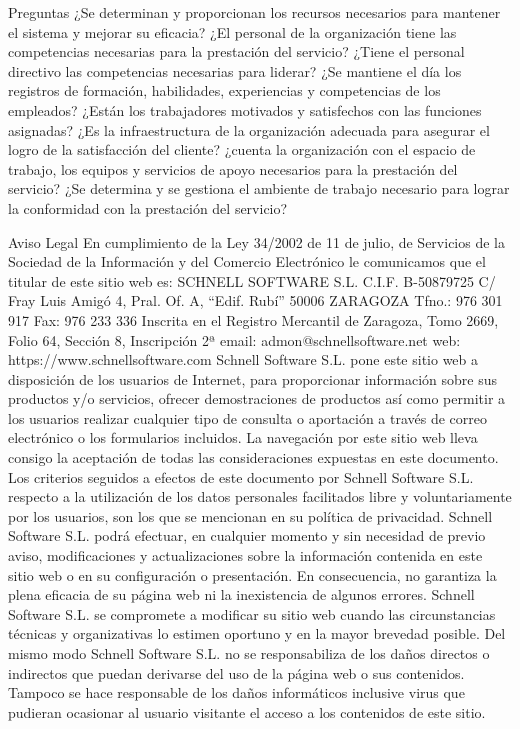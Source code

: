 \documentclass[10pt,a4paper]{article}
\begin{document}
\begin{enumerate}
Preguntas
¿Se determinan y proporcionan los recursos necesarios para mantener el sistema y mejorar su eficacia?
¿El personal de la organización tiene las competencias necesarias para la prestación del servicio?
¿Tiene el personal directivo las competencias necesarias para liderar?
¿Se mantiene el día los registros de formación, habilidades, experiencias y competencias de los empleados?
¿Están los trabajadores motivados y satisfechos con las funciones asignadas?
¿Es la infraestructura de la organización adecuada para asegurar el logro de la satisfacción del cliente?
¿cuenta la organización con el espacio de trabajo, los equipos y servicios de apoyo necesarios para la prestación del servicio?
¿Se determina y se gestiona el ambiente de trabajo necesario para lograr la conformidad con la prestación del servicio?

Aviso Legal
En cumplimiento de la Ley 34/2002 de 11 de julio, de Servicios de la Sociedad de la Información y del Comercio Electrónico le comunicamos que el titular de este sitio web es:
SCHNELL SOFTWARE S.L.
C.I.F. B-50879725
C/ Fray Luis Amigó 4, Pral. Of. A, “Edif. Rubí”
50006 ZARAGOZA
Tfno.: 976 301 917 Fax: 976 233 336
Inscrita en el Registro Mercantil de Zaragoza, Tomo 2669, Folio 64, Sección 8, Inscripción 2ª
email: admon@schnellsoftware.net
web: https://www.schnellsoftware.com
Schnell Software S.L. pone este sitio web a disposición de los usuarios de Internet, para proporcionar información sobre sus productos y/o servicios, ofrecer demostraciones de productos así como permitir a los usuarios realizar cualquier tipo de consulta o aportación a través de correo electrónico o los formularios incluidos.
La navegación por este sitio web lleva consigo la aceptación de todas las consideraciones expuestas en este documento.
Los criterios seguidos a efectos de este documento por Schnell Software S.L. respecto a la utilización de los datos personales facilitados libre y voluntariamente por los usuarios, son los que se mencionan en su política de privacidad.
Schnell Software S.L. podrá efectuar, en cualquier momento y sin necesidad de previo aviso, modificaciones y actualizaciones sobre la información contenida en este sitio web o en su configuración o presentación. En consecuencia, no garantiza la plena eficacia de su página web ni la inexistencia de algunos errores. Schnell Software S.L. se compromete a modificar su sitio web cuando las circunstancias técnicas y organizativas lo estimen oportuno y en la mayor brevedad posible.
Del mismo modo Schnell Software S.L. no se responsabiliza de los daños directos o indirectos que puedan derivarse del uso de la página web o sus contenidos. Tampoco se hace responsable de los daños informáticos inclusive virus que pudieran ocasionar al usuario visitante el acceso a los contenidos de este sitio.

\end{enumerate}
\end{document}

